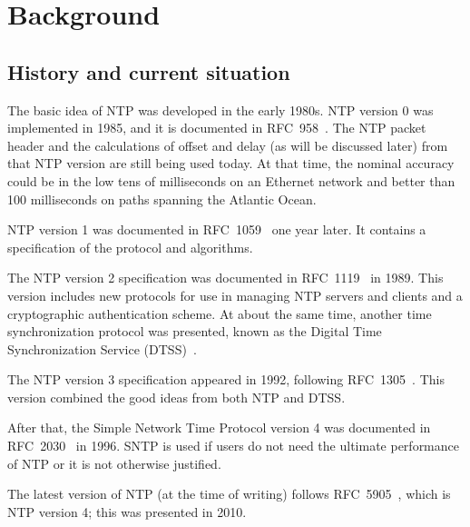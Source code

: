 
\chapter{Background}

\section{History and current situation}%
\label{sec:history_and_current_situation}
The basic idea of NTP was developed in the early 1980s. NTP version 0 was
implemented in 1985, and it is documented in RFC~958~\cite{rfc958}. 
The NTP packet header and the calculations of offset and delay (as will be
discussed later) from that NTP version are still being used today. At that
time, the nominal accuracy could be in the low tens of milliseconds on an
Ethernet network and better than 100 milliseconds on paths spanning the
Atlantic Ocean.

NTP version 1 was documented in RFC~1059~\cite{rfc1059} one year later. It
contains a specification of the protocol and algorithms.

The NTP version 2 specification was documented in RFC~1119~\cite{rfc1119} in 1989.
This version
includes new protocols for use in managing NTP servers and clients and a
cryptographic authentication scheme.
At about the same time, another time synchronization protocol was presented,
known as the Digital Time Synchronization Service (DTSS)~\cite{DTSS}.

The NTP version 3 specification appeared in 1992, following
RFC~1305~\cite{rfc1305}. This version combined the good ideas from both NTP and
DTSS\null.

After that, the Simple Network Time Protocol version 4 was documented in
RFC~2030~\cite{rfc2030}
in 1996. SNTP is used if users do not need the ultimate performance of NTP or
it is not otherwise justified.

The latest version of NTP (at the time of writing) follows
RFC~5905~\cite{rfc5905}, which is NTP version 4; this was presented in 2010.

